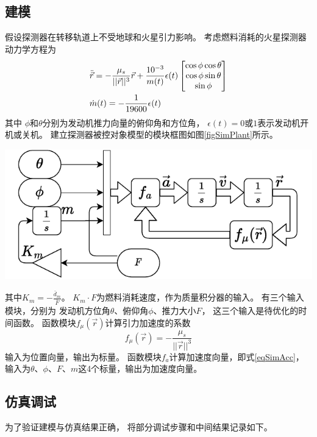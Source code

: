 \subsection{建模}
假设探测器在转移轨道上不受地球和火星引力影响。
考虑燃料消耗的火星探测器动力学方程为
\begin{align}
    &\ddot{\vec{r}} = -\frac{\mu_s}{||\vec{r}||^3}\vec{r}
    + \frac{10^{-3}}{m(t)}\epsilon(t)
    \left[\begin{matrix}
        \cos\phi\cos\theta \\ \cos\phi\sin\theta \\ \sin\phi
    \end{matrix}\right] \label{eqSimAcc} \\
    &\dot{m}(t) = -\frac{1}{19600}\epsilon(t) \notag
\end{align}
其中
$\phi$和$\theta$分别为发动机推力向量的俯仰角和方位角，
$\epsilon(t)=0$或$1$表示发动机开机或关机。
建立探测器被控对象模型的模块框图如图\ref{figSimPlant}所示。
\begin{center}
	\includegraphics[scale=0.8]{plant.pdf}  \\
	\label{figSimPlant}
\end{center}
其中$K_m=-\frac{\bar{d}_m}{\bar{F}}$。
$K_m\cdot F$为燃料消耗速度，作为质量积分器的输入。
有三个输入模块，分别为
发动机方位角$\theta$、俯仰角$\phi$、推力大小$F$，
这三个输入是待优化的时间函数。
函数模块$f_\mu(\vec{r})$计算引力加速度的系数
\[f_\mu(\vec{r})=-\frac{\mu_s}{||\vec{r}||^3}\]
输入为位置向量，输出为标量。
函数模块$f_a$计算加速度向量，即式\eqref{eqSimAcc}，
输入为$\theta$、$\phi$、$F$、$m$这4个标量，输出为加速度向量。

\subsection{仿真调试}
为了验证建模与仿真结果正确，
将部分调试步骤和中间结果记录如下。

